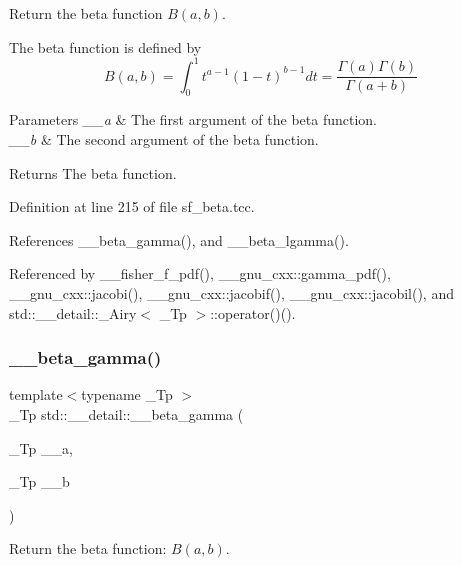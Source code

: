 Return the beta function $ B(a,b) $. 

The beta function is defined by \[ B(a,b) = \int_0^1 t^{a - 1} (1 - t)^{b - 1} dt = \frac{\Gamma(a)\Gamma(b)}{\Gamma(a+b)} \]


\begin{DoxyParams}{Parameters}
{\em \+\_\+\+\_\+a} & The first argument of the beta function. \\
\hline
{\em \+\_\+\+\_\+b} & The second argument of the beta function. \\
\hline
\end{DoxyParams}
\begin{DoxyReturn}{Returns}
The beta function. 
\end{DoxyReturn}


Definition at line 215 of file sf\+\_\+beta.\+tcc.



References \+\_\+\+\_\+beta\+\_\+gamma(), and \+\_\+\+\_\+beta\+\_\+lgamma().



Referenced by \+\_\+\+\_\+fisher\+\_\+f\+\_\+pdf(), \+\_\+\+\_\+gnu\+\_\+cxx\+::gamma\+\_\+pdf(), \+\_\+\+\_\+gnu\+\_\+cxx\+::jacobi(), \+\_\+\+\_\+gnu\+\_\+cxx\+::jacobif(), \+\_\+\+\_\+gnu\+\_\+cxx\+::jacobil(), and std\+::\+\_\+\+\_\+detail\+::\+\_\+\+Airy$<$ \+\_\+\+Tp $>$\+::operator()().

\mbox{\label{namespacestd_1_1____detail_a93cfa67cc3f14564925ed3153e055cd1}} 
\subsubsection{\texorpdfstring{\+\_\+\+\_\+beta\+\_\+gamma()}{\_\_beta\_gamma()}}
{\footnotesize\ttfamily template$<$typename \+\_\+\+Tp $>$ \\
\+\_\+\+Tp std\+::\+\_\+\+\_\+detail\+::\+\_\+\+\_\+beta\+\_\+gamma (\begin{DoxyParamCaption}\item[{\+\_\+\+Tp}]{\+\_\+\+\_\+a,  }\item[{\+\_\+\+Tp}]{\+\_\+\+\_\+b }\end{DoxyParamCaption})}



Return the beta function\+: $ B(a,b) $. 

